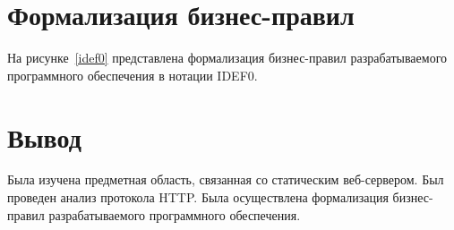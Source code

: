 \section{Формализация бизнес-правил}

На рисунке~\ref{idef0} представлена формализация бизнес-правил разрабатываемого программного обеспечения в нотации IDEF0.

\section*{Вывод}

Была изучена предметная область, связанная со статическим веб-сервером.
Был проведен анализ протокола HTTP.
Была осуществлена формализация бизнес-правил разрабатываемого программного обеспечения.

\clearpage
